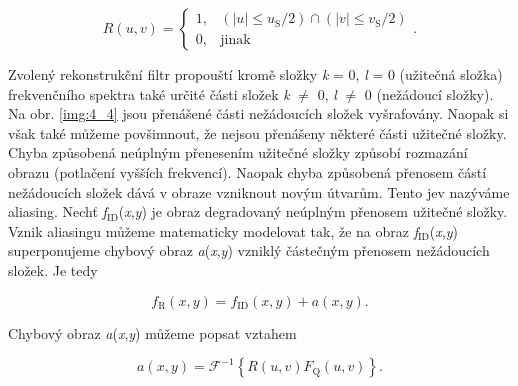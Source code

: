 \begin{equation} \label{eq:4_23} 
    R\left(u,v\right) = \left\{
    \begin{array}{cc}
    1, & \left(|u| \le u_\mathrm{S} /2\right) \cap \left(|v|\le v_\mathrm{S} /2\right) \\
    0, & \mathrm{jinak}
    \end{array}
    \right. .  
\end{equation}

Zvolený rekonstrukční filtr propouští kromě složky \textit{k} = 0, \textit{l} = 0 (užitečná složka) frekvenčního spektra také určité části složek \textit{k} $\neq$ 0, \textit{l} $\neq$ 0 (nežádoucí složky). Na obr. \ref{img:4_4} jsou přenášené části nežádoucích složek vyšrafovány. Naopak si však také můžeme povšimnout, že nejsou přenášeny některé části užitečné složky. Chyba způsobená neúplným přenesením užitečné složky způsobí rozmazání obrazu (potlačení vyšších frekvencí). Naopak chyba způsobená přenosem částí nežádoucích složek dává v obraze vzniknout novým útvarům. Tento jev nazýváme aliasing. Nechť \textit{f}$_\mathrm{ID}$(\textit{x},\textit{y}) je obraz degradovaný neúplným přenosem užitečné složky. Vznik aliasingu můžeme matematicky modelovat tak, že na obraz \textit{f}$_\mathrm{ID}$(\textit{x},\textit{y}) superponujeme chybový obraz \textit{a}(\textit{x},\textit{y}) vzniklý částečným přenosem nežádoucích složek. Je tedy

\begin{equation} \label{eq:4_24}
    f_\mathrm{R}(x, y) = f_\mathrm{ID}(x, y) + a(x, y).
\end{equation}

Chybový obraz \textit{a}(\textit{x},\textit{y}) můžeme popsat vztahem

\begin{equation} \label{eq:4_25}
    a(x, y) = \mathscr{F}^{-1} \left\{ R(u, v) F_\mathrm{Q}(u, v) \right\}.
\end{equation}

